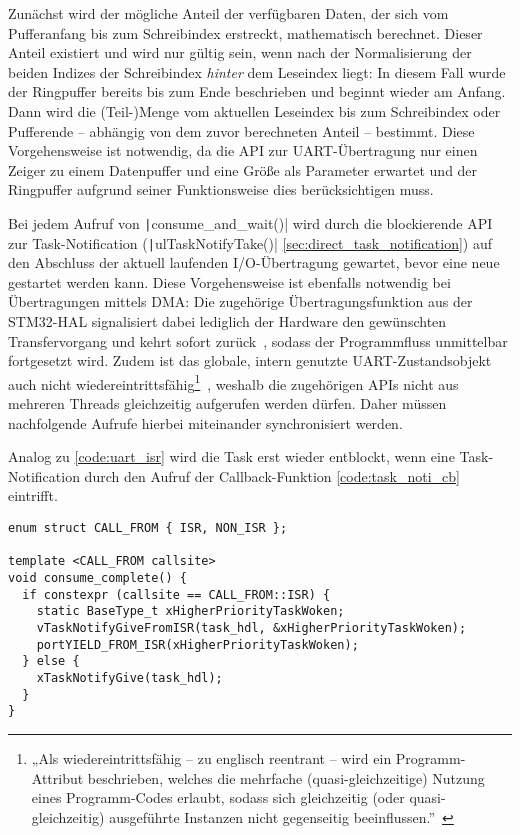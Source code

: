 Zunächst wird der mögliche Anteil der verfügbaren Daten, der sich vom
Pufferanfang bis zum Schreibindex erstreckt, mathematisch berechnet. Dieser
Anteil existiert und wird nur gültig sein, wenn nach der Normalisierung der
beiden Indizes der Schreibindex \textit{hinter} dem Leseindex liegt: In diesem
Fall wurde der Ringpuffer bereits bis zum Ende beschrieben und beginnt wieder am
Anfang. Dann wird die (Teil-)Menge vom aktuellen Leseindex bis zum Schreibindex
oder Pufferende -- abhängig von dem zuvor berechneten Anteil -- bestimmt. Diese
Vorgehensweise ist notwendig, da die API zur UART-Übertragung nur einen Zeiger
zu einem Datenpuffer und eine Größe als Parameter erwartet und der Ringpuffer
aufgrund seiner Funktionsweise dies berücksichtigen muss.

Bei jedem Aufruf von \texttt|consume_and_wait()| wird durch die
blockierende API zur Task-Notification (\texttt|ulTaskNotifyTake()|
\ref{sec:direct_task_notification}) auf den Abschluss der aktuell laufenden
I/O-Übertragung gewartet, bevor eine neue gestartet werden kann. Diese
Vorgehensweise ist ebenfalls notwendig bei Übertragungen mittels DMA: Die
zugehörige Übertragungsfunktion aus der STM32-HAL signalisiert dabei lediglich
der Hardware den gewünschten Transfervorgang und kehrt sofort
zurück~\cite{HAL_UART_Transmit_DMA}, sodass der Programmfluss unmittelbar
fortgesetzt wird. Zudem ist das globale, intern genutzte UART-Zustandsobjekt
auch nicht wiedereintrittsfähig\footnote{„Als wiedereintrittsfähig -- zu
englisch reentrant -- wird ein Programm-Attribut beschrieben, welches die
mehrfache (quasi-gleichzeitige) Nutzung eines Programm-Codes erlaubt, sodass
sich gleichzeitig (oder quasi-gleichzeitig) ausgeführte Instanzen nicht
gegenseitig
beeinflussen.”~\cite{wiedereintrittsfaehigkeit}}~\cite{stm32_hal_reentrancy},
weshalb die zugehörigen APIs nicht aus mehreren Threads gleichzeitig aufgerufen
werden dürfen. Daher müssen nachfolgende Aufrufe hierbei miteinander
synchronisiert werden.

Analog zu \ref{code:uart_isr} wird die Task erst wieder entblockt, wenn eine
Task-Notification durch den Aufruf der Callback-Funktion \ref{code:task_noti_cb}
eintrifft.

\begin{code}
\begin{verbatim}
enum struct CALL_FROM { ISR, NON_ISR };

template <CALL_FROM callsite>
void consume_complete() {
  if constexpr (callsite == CALL_FROM::ISR) {
    static BaseType_t xHigherPriorityTaskWoken;
    vTaskNotifyGiveFromISR(task_hdl, &xHigherPriorityTaskWoken);
    portYIELD_FROM_ISR(xHigherPriorityTaskWoken);
  } else {
    xTaskNotifyGive(task_hdl);
  }
}
\end{verbatim}
    \label{code:task_noti_cb}
\end{code}

